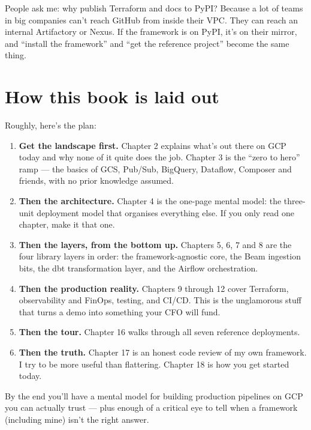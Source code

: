 \documentclass[
  11pt,
  british,
  oneside]{book}
\providecommand{\tightlist}{%
  \setlength{\itemsep}{0pt}\setlength{\parskip}{0pt}}
\begin{document}
People ask me: why publish Terraform and docs to PyPI? Because a lot of
teams in big companies can't reach GitHub from inside their VPC. They
can reach an internal Artifactory or Nexus. If the framework is on PyPI,
it's on their mirror, and ``install the framework'' and ``get the
reference project'' become the same thing.

\hypertarget{how-this-book-is-laid-out}{%
\section{How this book is laid out}\label{how-this-book-is-laid-out}}

Roughly, here's the plan:

\begin{enumerate}
\def\labelenumi{\arabic{enumi}.}
\tightlist
\item
  \textbf{Get the landscape first.} Chapter 2 explains what's out there
  on GCP today and why none of it quite does the job. Chapter 3 is the
  ``zero to hero'' ramp --- the basics of GCS, Pub/Sub, BigQuery,
  Dataflow, Composer and friends, with no prior knowledge assumed.
\item
  \textbf{Then the architecture.} Chapter 4 is the one-page mental
  model: the three-unit deployment model that organises everything else.
  If you only read one chapter, make it that one.
\item
  \textbf{Then the layers, from the bottom up.} Chapters 5, 6, 7 and 8
  are the four library layers in order: the framework-agnostic core, the
  Beam ingestion bits, the dbt transformation layer, and the Airflow
  orchestration.
\item
  \textbf{Then the production reality.} Chapters 9 through 12 cover
  Terraform, observability and FinOps, testing, and CI/CD. This is the
  unglamorous stuff that turns a demo into something your CFO will fund.
\item
  \textbf{Then the tour.} Chapter 16 walks through all seven reference
  deployments.
\item
  \textbf{Then the truth.} Chapter 17 is an honest code review of my own
  framework. I try to be more useful than flattering. Chapter 18 is how
  you get started today.
\end{enumerate}

By the end you'll have a mental model for building production pipelines
on GCP you can actually trust --- plus enough of a critical eye to tell
when a framework (including mine) isn't the right answer.
\end{document}
